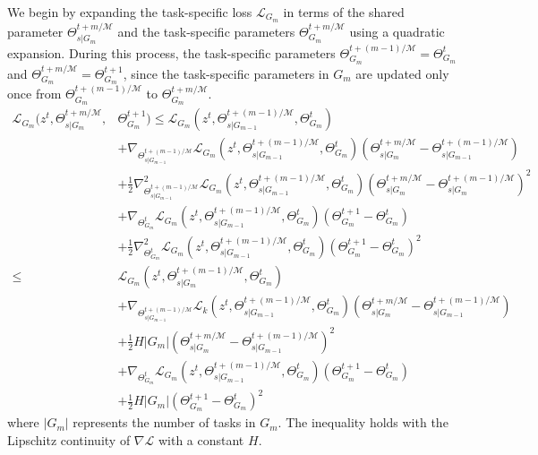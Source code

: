 We begin by expanding the task-specific loss $\mathcal{L}_{G_m}$ in terms of the shared parameter $\Theta_{s|G_m}^{t+m/\mathcal{M}}$ and the task-specific parameters $\Theta_{G_m}^{t+m/\mathcal{M}}$ using a quadratic expansion. During this process, the task-specific parameters $\Theta_{G_m}^{t+(m-1)/\mathcal{M}}=\Theta_{G_m}^t$ and $\Theta_{G_m}^{t+m/\mathcal{M}}=\Theta_{G_m}^{t+1}$, since the task-specific parameters in $G_m$ are updated only once from $\Theta_{G_m}^{t+(m-1)/\mathcal{M}}$ to $\Theta_{G_m}^{t+m/\mathcal{M}}$.
\begin{align}
    \mathcal{L}_{G_m} (z^t, \Theta_{s|G_m}^{t+m/\mathcal{M}},& \Theta_{G_m}^{t+1}) \leq \mathcal{L}_{G_m} (z^t, \Theta_{s|G_{m-1}}^{t+(m-1)/\mathcal{M}}, \Theta_{G_m}^t) \label{eq:theo4_in0}\\
    &+\nabla_{\Theta_{s|G_{m-1}}^{t+(m-1)/\mathcal{M}}}\mathcal{L}_{G_m}(z^t, \Theta_{s|G_{m-1}}^{t+(m-1)/\mathcal{M}}, \Theta_{G_m}^t)(\Theta_{s|G_m}^{t+m/\mathcal{M}}-\Theta_{s|G_{m-1}}^{t+(m-1)/\mathcal{M}})\\
    &+\frac{1}{2}\nabla_{\Theta_{s|G_{m-1}}^{t+(m-1)/\mathcal{M}}}^{2}\mathcal{L}_{G_m}(z^t, \Theta_{s|G_{m-1}}^{t+(m-1)/\mathcal{M}}, \Theta_{G_m}^t)(\Theta_{s|G_m}^{t+m/\mathcal{M}}-\Theta_{s|G_m}^{t+(m-1)/\mathcal{M}})^{2}\\
    &+\nabla_{\Theta_{G_m}^t}\mathcal{L}_{G_m}(z^t, \Theta_{s|G_{m-1}}^{t+(m-1)/\mathcal{M}}, \Theta_{G_m}^t)(\Theta_{G_m}^{t+1}-\Theta_{G_m}^t)\\
    &+\frac{1}{2}\nabla_{\Theta_{G_m}^t}^2 \mathcal{L}_{G_m}(z^t, \Theta_{s|G_{m-1}}^{t+(m-1)/\mathcal{M}}, \Theta_{G_m}^t)(\Theta_{G_m}^{t+1}-\Theta_{G_m}^t)^{2}\\
    \leq &\mathcal{L}_{G_m} (z^t, \Theta_{s|G_m}^{t+(m-1)/\mathcal{M}}, \Theta_{G_m}^t)\\
    &+\nabla_{\Theta_{s|G_{m-1}}^{t+(m-1)/\mathcal{M}}}\mathcal{L}_k(z^t, \Theta_{s|G_{m-1}}^{t+(m-1)/\mathcal{M}}, \Theta_{G_m}^t)(\Theta_{s|G_m}^{t+m/\mathcal{M}}-\Theta_{s|G_{m-1}}^{t+(m-1)/\mathcal{M}})\\
    &+\frac{1}{2} H|G_m| (\Theta_{s|G_m}^{t+m/\mathcal{M}}-\Theta_{s|G_{m-1}}^{t+(m-1)/\mathcal{M}})^{2}\\
    &+\nabla_{\Theta_{G_m}^t}\mathcal{L}_{G_m}(z^t, \Theta_{s|G_{m-1}}^{t+(m-1)/\mathcal{M}}, \Theta_{G_m}^t)(\Theta_{G_m}^{t+1}-\Theta_{G_m}^t)\\
    &+\frac{1}{2} H|G_m| (\Theta_{G_m}^{t+1}-\Theta_{G_m}^t)^{2}
\end{align}
where $|G_m|$ represents the number of tasks in $G_m$. The inequality holds with the Lipschitz continuity of $\nabla \mathcal{L}$ with a constant $H$.


